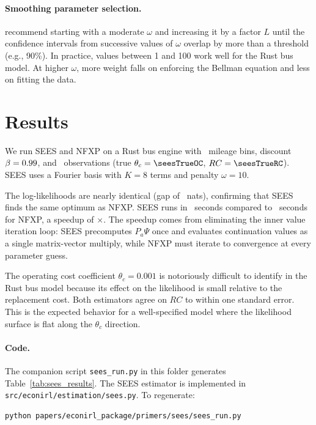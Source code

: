 \documentclass[11pt]{article}
\begin{document}
\paragraph{Smoothing parameter selection.}
\citet{luoSang2024} recommend starting with a moderate $\omega$ and increasing it by a factor $L$ until the confidence intervals from successive values of $\omega$ overlap by more than a threshold (e.g., 90\%). In practice, values between 1 and 100 work well for the Rust bus model. At higher $\omega$, more weight falls on enforcing the Bellman equation and less on fitting the data.


\section{Results}



We run SEES and NFXP on a Rust bus engine with \seesNstates\ mileage bins, discount $\beta = 0.99$, and \seesNobs\ observations (true $\theta_c = \seesTrueOC$, $RC = \seesTrueRC$). SEES uses a Fourier basis with $K = 8$ terms and penalty $\omega = 10$.

The log-likelihoods are nearly identical (gap of \seesLLgap\ nats), confirming that SEES finds the same optimum as NFXP. SEES runs in \seesTime\ seconds compared to \seesNfxpTime\ seconds for NFXP, a speedup of \seesSpeedup$\times$. The speedup comes from eliminating the inner value iteration loop: SEES precomputes $P_a \Psi$ once and evaluates continuation values as a single matrix-vector multiply, while NFXP must iterate to convergence at every parameter guess.

The operating cost coefficient $\theta_c = 0.001$ is notoriously difficult to identify in the Rust bus model because its effect on the likelihood is small relative to the replacement cost. Both estimators agree on $RC$ to within one standard error. This is the expected behavior for a well-specified model where the likelihood surface is flat along the $\theta_c$ direction.

\paragraph{Code.}
The companion script \texttt{sees\_run.py} in this folder generates Table~\ref{tab:sees_results}. The SEES estimator is implemented in \texttt{src/econirl/estimation/sees.py}. To regenerate:
\begin{verbatim}
python papers/econirl_package/primers/sees/sees_run.py
\end{verbatim}
\end{document}
